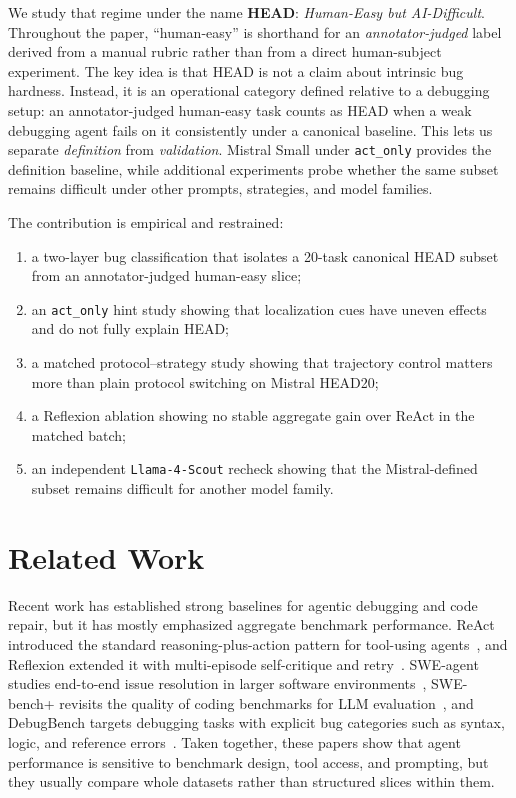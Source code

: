 \documentclass{article}
\begin{document}
We study that regime under the name \textbf{HEAD}: \emph{Human-Easy but AI-Difficult}. Throughout the paper, ``human-easy'' is shorthand for an \emph{annotator-judged} label derived from a manual rubric rather than from a direct human-subject experiment. The key idea is that HEAD is not a claim about intrinsic bug hardness. Instead, it is an operational category defined relative to a debugging setup: an annotator-judged human-easy task counts as HEAD when a weak debugging agent fails on it consistently under a canonical baseline. This lets us separate \emph{definition} from \emph{validation}. Mistral Small under \texttt{act\_only} provides the definition baseline, while additional experiments probe whether the same subset remains difficult under other prompts, strategies, and model families.

The contribution is empirical and restrained:
\begin{enumerate}
    \item a two-layer bug classification that isolates a 20-task canonical HEAD subset from an annotator-judged human-easy slice;
    \item an \texttt{act\_only} hint study showing that localization cues have uneven effects and do not fully explain HEAD;
    \item a matched protocol--strategy study showing that trajectory control matters more than plain protocol switching on Mistral HEAD20;
    \item a Reflexion ablation showing no stable aggregate gain over ReAct in the matched batch;
    \item an independent \texttt{Llama-4-Scout} recheck showing that the Mistral-defined subset remains difficult for another model family.
\end{enumerate}

\section{Related Work}

Recent work has established strong baselines for agentic debugging and code repair, but it has mostly emphasized aggregate benchmark performance. ReAct introduced the standard reasoning-plus-action pattern for tool-using agents~\citep{yao2023react}, and Reflexion extended it with multi-episode self-critique and retry~\citep{shinn2023reflexion}. SWE-agent studies end-to-end issue resolution in larger software environments~\citep{yang2024sweagent}, SWE-bench+ revisits the quality of coding benchmarks for LLM evaluation~\citep{jimenez2024swebenchplus}, and DebugBench targets debugging tasks with explicit bug categories such as syntax, logic, and reference errors~\citep{wu2024debugbench}. Taken together, these papers show that agent performance is sensitive to benchmark design, tool access, and prompting, but they usually compare whole datasets rather than structured slices within them.
\end{document}
